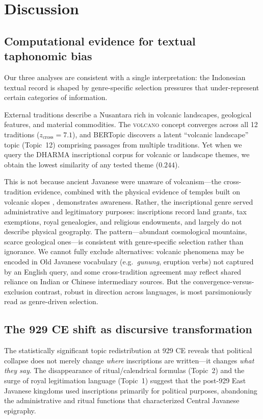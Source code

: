 \documentclass[12pt]{article}
\begin{document}
\section{Discussion}

\subsection{Computational evidence for textual taphonomic bias}

Our three analyses are consistent with a single interpretation: the Indonesian textual record is shaped by genre-specific selection pressures that under-represent certain categories of information.

External traditions describe a Nusantara rich in volcanic landscapes, geological features, and material commodities.
The \textsc{volcano} concept converges across all 12 traditions ($z_\mathrm{cross} = 7.1$), and BERTopic discovers a latent ``volcanic landscape'' topic (Topic~12) comprising passages from multiple traditions.
Yet when we query the DHARMA inscriptional corpus for volcanic or landscape themes, we obtain the lowest similarity of any tested theme ($0.244$).

This is not because ancient Javanese were unaware of volcanism---the cross-tradition evidence, combined with the physical evidence of temples built on volcanic slopes \citep[submitted]{Amien2026b}, demonstrates awareness.
Rather, the inscriptional genre served administrative and legitimatory purposes: inscriptions record land grants, tax exemptions, royal genealogies, and religious endowments, and largely do not describe physical geography.
The pattern---abundant cosmological mountains, scarce geological ones---is consistent with genre-specific selection rather than ignorance.
We cannot fully exclude alternatives: volcanic phenomena may be encoded in Old Javanese vocabulary (e.g.\ \emph{gunung}, eruption verbs) not captured by an English query, and some cross-tradition agreement may reflect shared reliance on Indian or Chinese intermediary sources. But the convergence-versus-exclusion contrast, robust in direction across languages, is most parsimoniously read as genre-driven selection.

\subsection{The 929 CE shift as discursive transformation}

The statistically significant topic redistribution at 929 CE reveals that political collapse does not merely change \emph{where} inscriptions are written---it changes \emph{what they say}.
The disappearance of ritual/calendrical formulas (Topic~2) and the surge of royal legitimation language (Topic~1) suggest that the post-929 East Javanese kingdoms used inscriptions primarily for political purposes, abandoning the administrative and ritual functions that characterized Central Javanese epigraphy.
\end{document}
